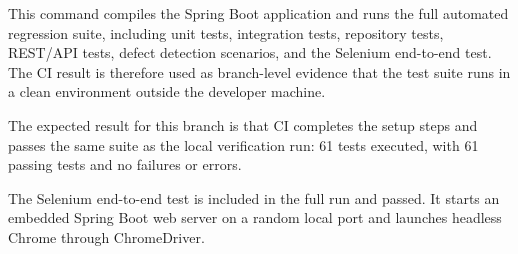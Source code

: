 This command compiles the Spring Boot application and runs the full automated regression suite, including unit tests, integration tests, repository tests, REST/API tests, defect detection scenarios, and the Selenium end-to-end test. The CI result is therefore used as branch-level evidence that the test suite runs in a clean environment outside the developer machine.

The expected result for this branch is that CI completes the setup steps and passes the same suite as the local verification run: 61 tests executed, with 61 passing tests and no failures or errors.

The Selenium end-to-end test is included in the full run and passed. It starts an embedded Spring Boot web server on a random local port and launches headless Chrome through ChromeDriver.
